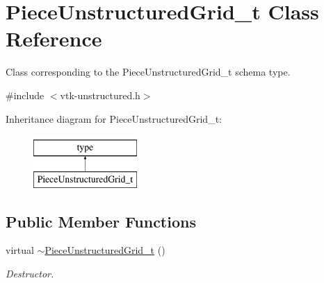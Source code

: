 \hypertarget{classPieceUnstructuredGrid__t}{}\section{Piece\+Unstructured\+Grid\+\_\+t Class Reference}
\label{classPieceUnstructuredGrid__t}


Class corresponding to the Piece\+Unstructured\+Grid\+\_\+t schema type.  




{\ttfamily \#include $<$vtk-\/unstructured.\+h$>$}

Inheritance diagram for Piece\+Unstructured\+Grid\+\_\+t\+:\begin{figure}[H]
\begin{center}
\leavevmode
\includegraphics[height=2.000000cm]{classPieceUnstructuredGrid__t}
\end{center}
\end{figure}
\subsection*{Public Member Functions}
\begin{DoxyCompactItemize}
\item 
virtual \hyperlink{classPieceUnstructuredGrid__t_a9d1eb720775ac4e3b7778f898decc264}{$\sim$\+Piece\+Unstructured\+Grid\+\_\+t} ()
\begin{DoxyCompactList}\small\item\em Destructor. \end{DoxyCompactList}\end{DoxyCompactItemize}
